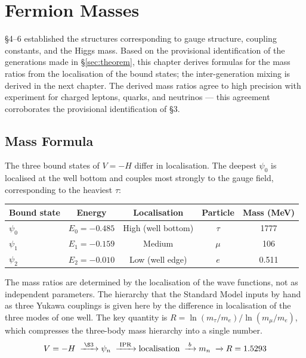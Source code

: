 \documentclass[12pt,a4paper]{article}
\begin{document}
\section{Fermion Masses}\label{sec:physics}

\S4--6 established the structures corresponding to gauge structure,
coupling constants, and the Higgs mass.
Based on the provisional identification of the generations made in
\S\ref{sec:theorem}, this chapter derives
formulas for the mass ratios from the localisation of the bound states;
the inter-generation mixing is derived in the next chapter.
The derived mass ratios agree to high precision with experiment
for charged leptons, quarks, and neutrinos --- this agreement corroborates the provisional identification of \S3.

\subsection{Mass Formula}\label{sec:mass}

The three bound states of $V = -H$ differ in localisation.
The deepest $\psi_0$ is localised at the well bottom and couples
most strongly to the gauge field, corresponding to the heaviest $\tau$:
\begin{center}\small
\begin{tabular}{lcccc}
\toprule
Bound state & Energy & Localisation & Particle & Mass (MeV) \\
\midrule
$\psi_0$ & $E_0 = -0.485$ & High (well bottom) & $\tau$ & 1777 \\
$\psi_1$ & $E_1 = -0.159$ & Medium & $\mu$ & 106 \\
$\psi_2$ & $E_2 = -0.010$ & Low (well edge) & $e$ & 0.511 \\
\bottomrule
\end{tabular}
\end{center}

\noindent
The mass ratios are determined by the localisation of the wave
functions, not as independent parameters.
The hierarchy that the Standard Model inputs by
hand as three Yukawa couplings is given here by the difference in
localisation of the three modes of one well.
The key quantity is $R = \ln(m_\tau/m_e)/\ln(m_\mu/m_e)$,
which compresses the three-body mass hierarchy into a single
number.
\begin{equation}
  V = -H \;\xrightarrow{\;\text{\S3}\;} \psi_n
  \;\xrightarrow{\;\text{IPR}\;} \mathrm{localisation}
  \;\xrightarrow{\;b\;} m_n
  \;\xrightarrow{\;} R = 1.5293
\end{equation}
\end{document}

